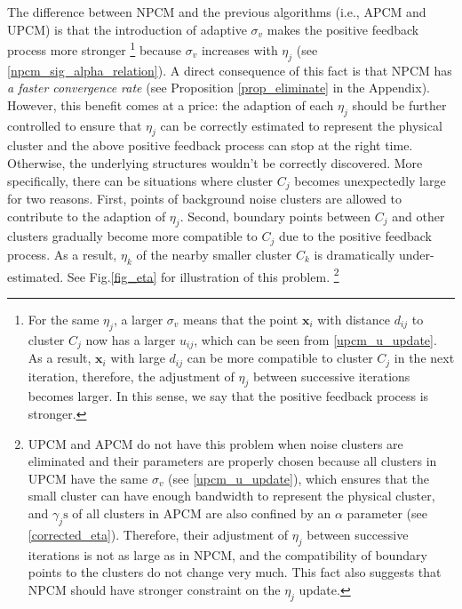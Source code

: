 \documentclass[conference]{IEEEtran}
\theoremstyle{definition}
\begin{document}
The difference between NPCM and the previous algorithms (i.e., APCM and UPCM) is that the introduction of adaptive $\sigma_v$ makes the positive feedback process more stronger
\footnote{For the same $\eta_j$, a larger $\sigma_v$ means that the point $\mathbf{x}_i$ with distance $d_{ij}$ to cluster $C_j$ now has a larger $u_{ij}$, which can be seen from \eqref{upcm_u_update}. As a result, $\mathbf{x}_i$ with large $d_{ij}$ can be more compatible to cluster $C_j$ in the next iteration, therefore, the adjustment of $\eta_j$ between successive iterations becomes larger. In this sense, we say that the positive feedback process is stronger.}
because $\sigma_v$ increases with $\eta_j$ (see \eqref{npcm_sig_alpha_relation}). A direct consequence of this fact is that NPCM has \emph{a faster convergence rate} (see Proposition \ref{prop_eliminate} in the Appendix).
However, this benefit comes at a price: the adaption of each $\eta_j$ should be further controlled to ensure that $\eta_j$ can be correctly estimated to represent the physical cluster and the above positive feedback process can stop at the right time. Otherwise, the underlying structures wouldn't be correctly discovered.
More specifically, there can be situations where cluster $C_j$ becomes unexpectedly large for two reasons. First, points of background noise clusters are allowed to contribute to the adaption of $\eta_j$. Second, boundary points between $C_j$ and other clusters gradually become more compatible to $C_j$ due to the positive feedback process. As a result, $\eta_k$ of the nearby smaller cluster $C_k$ is dramatically under-estimated. See Fig.\ref{fig_eta} for illustration of this problem.
\footnote{UPCM and APCM do not have this problem when noise clusters are eliminated and their parameters are properly chosen because all clusters in UPCM have the same $\sigma_v$ (see \eqref{upcm_u_update}), which ensures that the small cluster can have enough bandwidth to represent the physical cluster, and $\gamma_j\text{s}$ of all clusters in APCM are also confined by an $\alpha$ parameter (see \eqref{corrected_eta}). Therefore, their adjustment of $\eta_j$ between successive iterations is not as large as in NPCM, and the compatibility of boundary points to the clusters do not change very much. This fact also suggests that NPCM should have stronger constraint on the $\eta_j$ update.}
\end{document}
